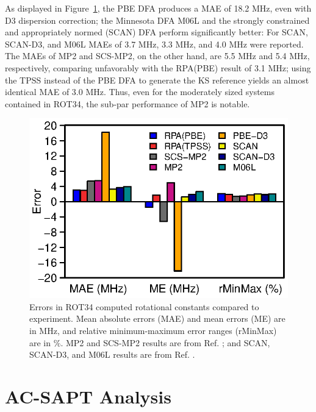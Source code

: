 \documentclass[journal=jctcce,manuscript=article]{achemso}
\providecommand{\DIFadd}[1]{{\protect\color{blue}\uwave{#1}}} %
\providecommand{\DIFaddFL}[1]{\DIFadd{#1}} %
\providecommand{\DIFaddbeginFL}{} %
\providecommand{\DIFaddendFL}{} %
\newcommand{\DIFaddincludegraphics}[2][]{{\color{blue}\fbox{\DIFOincludegraphics[#1]{#2}}}} %
\DeclareRobustCommand{\DIFaddbeginFL}{\DIFOaddbeginFL \let\includegraphics\DIFaddincludegraphics} %
\DeclareRobustCommand{\DIFaddendFL}{\DIFOaddendFL \let\includegraphics\DIFOincludegraphics} %
\begin{document}
As displayed in Figure~\ref{fig:methods_bar},
the PBE DFA produces a MAE of 18.2 MHz, even with D3 dispersion correction;
the Minnesota DFA M06L\cite{doi:10.1063/1.2370993}
and the strongly constrained and appropriately normed (SCAN)\cite{PhysRevLett.115.036402}
DFA perform significantly better:\cite{BrandenburgPhysRevB} For SCAN, SCAN-D3,
and M06L MAEs of 3.7 MHz, 3.3 MHz, and 4.0 MHz were
reported.\cite{BrandenburgPhysRevB} The MAEs of MP2 
and SCS-MP2, on the other hand, are 5.5 MHz and 5.4
MHz,\cite{Risthaus14JComputChem35p1509} respectively, comparing
unfavorably with the RPA(PBE) result of 3.1 MHz; using the TPSS instead
of the PBE DFA to generate the KS reference yields an almost identical
MAE of 3.0 MHz. Thus, even for the moderately sized systems contained in
ROT34, the sub-par performance of MP2 is notable.

\begin{figure}[hbtp]
   \centering
  \includegraphics{deviate_v4.eps}
  \caption{Errors in ROT34 computed rotational constants compared to
    experiment.\cite{Risthaus14JComputChem35p1509}  
    Mean absolute errors (MAE) and mean errors (ME) are in MHz,
    and relative minimum-maximum error ranges
    (rMinMax) are in $\%$. MP2 and SCS-MP2 results are from
    Ref. ; and SCAN, SCAN-D3,
    \DIFaddbeginFL \DIFaddFL{PBE-D3, }\DIFaddendFL and M06L results are from Ref. .}
  \label{fig:methods_bar}
\end{figure}

\section{AC-SAPT Analysis}
\label{sec:SAPT}
\end{document}
